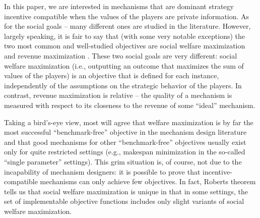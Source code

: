 \documentclass{article}
\begin{document}
In this paper, we are interested in mechanisms that are dominant strategy incentive compatible when the values of the players are private information. As for the social goals -- many different ones are studied in the literature. However, largely speaking, it is fair to say that (with some very notable exceptions) the two most common and well-studied objectives are social welfare maximization \cite{Vic61,Cla71,Gro73} and revenue maximization \cite{Mye81}. These two social goals are very different: social welfare maximization (i.e., outputting an outcome that maximizes the sum of values of the players) is an objective that is defined for each instance, independently of the assumptions on the strategic behavior of the players. In contrast, revenue maximization is relative -- the quality of a mechanism is measured with respect to its closeness to the revenue of some ``ideal'' mechanism.

Taking a bird's-eye view, most will agree that welfare maximization is by far the most successful ``benchmark-free'' objective in the mechanism design literature and that good mechanisms for other ``benchmark-free'' objectives usually exist only for quite restricted settings (e.g., makespan minimization in the so-called ``single parameter'' settings). This grim situation is, of course, not due to the incapability of mechanism designers: it is possible to prove that incentive-compatible mechanisms can only achieve few objectives. In fact, Roberts theorem \cite{Rob79} tells us that social welfare maximization is unique in that in some settings, the set of implementable objective functions includes only slight variants of social welfare maximization.
\end{document}

